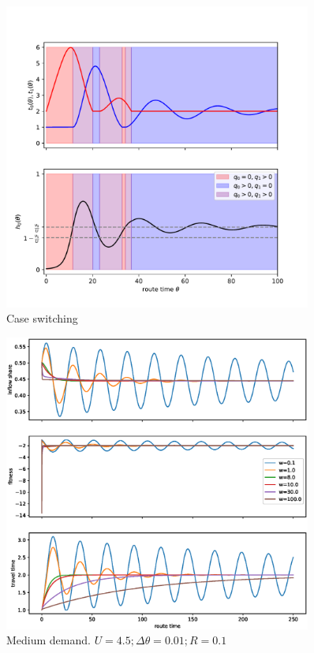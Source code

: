 \documentclass[12pt]{article}
\begin{document}
\begin{figure}
	\includegraphics[width=0.9\textwidth]{img/case_switching.pdf}
	\caption{ Case switching }
	\label{fig:case_switching}
\end{figure}


\begin{figure}
	\includegraphics[width=0.9\textwidth]{img/replicator_medium_demand.eps}
	\caption{ Medium demand. $U = 4.5; \Delta\theta = 0.01; R = 0.1$ }
	\label{fig:replicator_medium_demand}

\end{figure}
\end{document}

